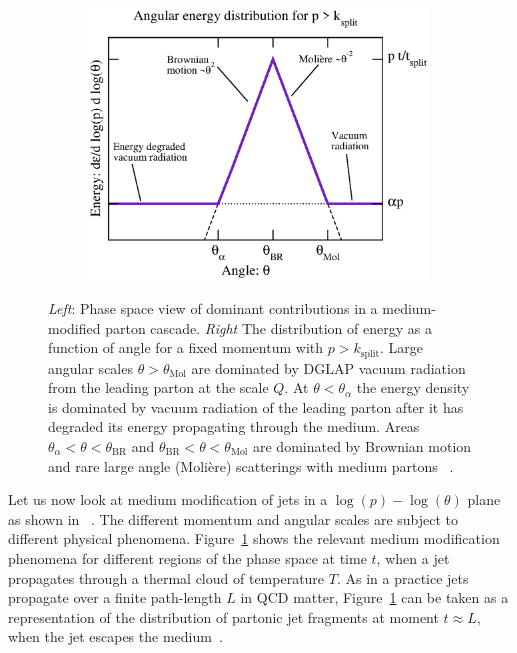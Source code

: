 \begin{figure}[tb]
\begin{subfigure}{0.48\textwidth}
\end{subfigure}
\begin{subfigure}{0.48\textwidth}
\includegraphics[width=0.99\textwidth]{figures/e-vs-th3.eps}
\end{subfigure}
\caption{{\it Left}: Phase space view of dominant contributions in a medium-modified parton cascade. {\it Right} The distribution of energy as a function of angle for a fixed momentum with $p > k_\mathrm{split}$. Large angular scales $\theta > \theta_\mathrm{Mol}$ are dominated by DGLAP vacuum radiation from the leading parton at the scale $Q$. At $\theta < \theta_\alpha$ the energy density is dominated by vacuum radiation of the leading parton after it has degraded its energy propagating through the medium. Areas $\theta_\alpha < \theta < \theta_\mathrm{BR}$ and $\theta_\mathrm{BR} < \theta < \theta_\mathrm{Mol}$ are dominated by Brownian motion and rare large angle (Moli\`ere) scatterings with medium partons ~\cite{Kurkela:2014tla}.}
\label{fig:cascades}
\end{figure}

Let us now look at medium modification of jets in a $\log\left(p\right)-\log\left(\theta\right)$ plane as shown in ~\cite{Kurkela:2014tla}. The different momentum and angular scales are subject to different physical phenomena. Figure~\ref{fig:cascades} shows the relevant medium modification phenomena for different regions of the phase space at time $t$, when a jet propagates through a thermal cloud of temperature $T$. As in a practice jets propagate over a finite path-length $L$ in QCD matter, Figure~\ref{fig:cascades} can be taken as a representation of the distribution of partonic jet fragments at moment $t \approx L$, when the jet escapes the medium~\cite{Kurkela:2014tla}.


